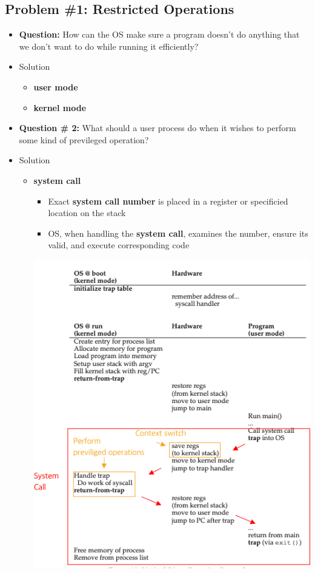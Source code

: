 \documentclass[12pt]{article}
\begin{document}
\subsection{Problem \#1: Restricted Operations}
\begin{itemize}
    \item \textbf{Question:} How can the OS make sure a program doesn't do anything that we
    don't want to do while running it efficiently?
    \item Solution
    \begin{itemize}
        \item \textbf{user mode}
        \item \textbf{kernel mode}
    \end{itemize}
    \item \textbf{Question \# 2:} What should a user process do when it wishes to perform
    some kind of previleged operation?
    \item Solution
    \begin{itemize}
        \item \textbf{system call}
        \begin{itemize}
            \item Exact \textbf{system call number} is placed in a register or specificied location on the stack
            \item OS, when handling the \textbf{system call}, examines the number, ensure its valid, and execute
            corresponding code
        \end{itemize}

        \begin{center}
        \includegraphics[width=0.6\linewidth]{images/notes_4_9.png}
        \end{center}
    \end{itemize}
\end{itemize}
\end{document}
